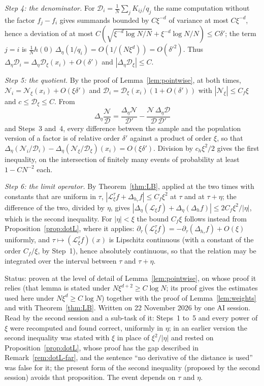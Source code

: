 \documentclass[11pt,a4paper]{article}
\makeatletter
\theoremstyle{stmt}
\theoremstyle{defn}
\theoremstyle{rmk}
\renewenvironment{proof}[1][\proofname]{\par\pushQED{\qed}\normalfont\topsep6\p@\@plus6\p@\relax
  \trivlist\item[\hskip\labelsep{\sffamily\itshape\small #1.}]\ignorespaces}{\popQED\endtrivlist\@endpefalse}
\numberwithin{equation}{section}
\newcommand{\status}[1]{\par\noindent\textsf{\small Status: #1}\par}
\newcommand{\Lc}{\mathcal{L}}
\makeatother
\begin{document}
{\begin{proof}
\emph{Step 4: the denominator.} For $\mathcal D_i=\frac1N\sum_jK_{ij}/q_j$ the same computation without the factor $f_j-f_i$ gives summands bounded by $C\xi^{-d}$ of variance at most $C\xi^{-d}$, hence a deviation of at most $C(\sqrt{\xi^{-d}\log N/N}+\xi^{-d}\log N/N)\le C\delta'$; the term $j=i$ is $\frac1Nh(0)\,\Delta_\eta(1/q_i)=O(1/(N\xi^d))=O(\delta'^2)$. Thus $\Delta_\eta\mathcal D_i=\Delta_\eta\mathcal D_\xi(x_i)+O(\delta')$ and $|\Delta_\eta\mathcal D_\xi|\le C$.

\emph{Step 5: the quotient.} By the proof of Lemma~\ref{lem:pointwise}, at both times, $\mathcal N_i=\mathcal N_\xi(x_i)+O(\xi\delta')$ and $\mathcal D_i=\mathcal D_\xi(x_i)(1+O(\delta'))$ with $|\mathcal N_\xi|\le C_f\xi$ and $c\le\mathcal D_\xi\le C$. From
\[
\Delta_\eta\frac{\mathcal N}{\mathcal D}=\frac{\Delta_\eta\mathcal N}{\mathcal D'}-\frac{\mathcal N\,\Delta_\eta\mathcal D}{\mathcal D\,\mathcal D'}
\]
and Steps~3 and~4, every difference between the sample and the population version of a factor is of relative order $\delta'$ against a product of order $\xi$, so that $\Delta_\eta(\mathcal N_i/\mathcal D_i)-\Delta_\eta(\mathcal N_\xi/\mathcal D_\xi)(x_i)=O(\xi\delta')$. Division by $c_h\xi^2/2$ gives the first inequality, on the intersection of finitely many events of probability at least $1-CN^{-2}$ each.

\emph{Step 6: the limit operator.} By Theorem~\ref{thm:LB}, applied at the two times with constants that are uniform in $\tau$, $|\Lc^\tau_\xi f+\Delta_{h_\tau}f|\le C_f\xi^2$ at $\tau$ and at $\tau+\eta$; the difference of the two, divided by $\eta$, gives $|\Delta_\eta(\Lc_\xi f)+\Delta_\eta(\Delta_hf)|\le2C_f\xi^2/|\eta|$, which is the second inequality. For $|\eta|<\xi$ the bound $C_f\xi$ follows instead from Proposition~\ref{prop:dotL}, where it applies: $\partial_\tau(\Lc^\tau_\xi f)=-\partial_\tau(\Delta_{h_\tau}f)+O(\xi)$ uniformly, and $\tau\mapsto(\Lc^\tau_\xi f)(x)$ is Lipschitz continuous (with a constant of the order $C_f/\xi$, by Step~1), hence absolutely continuous, so that the relation may be integrated over the interval between $\tau$ and $\tau+\eta$.
\end{proof}
\status{proven at the level of detail of Lemma~\ref{lem:pointwise}, on whose proof it relies (that lemma is stated under $N\xi^{d+2}\ge C\log N$; its proof gives the estimates used here under $N\xi^d\ge C\log N$) together with the proof of Lemma~\ref{lem:weights} and with Theorem~\ref{thm:LB}. Written on 22 November 2026 by one AI session. Read by the second session and a sub-task of it: Steps~1 to~5 and every power of $\xi$ were recomputed and found correct, uniformly in $\eta$; in an earlier version the second inequality was stated with $\xi$ in place of $\xi^2/|\eta|$ and rested on Proposition~\ref{prop:dotL}, whose proof has the gap described in Remark~\ref{rem:dotL-far}, and the sentence ``no derivative of the distance is used'' was false for it; the present form of the second inequality (proposed by the second session) avoids that proposition. The event depends on $\tau$ and $\eta$.}

}
\end{document}
